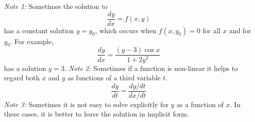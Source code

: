     \indent
    \textit{Note 1:} Sometimes the solution to $$\frac{dy}{dx} = f(x, y)$$ has a constant solution $y = y_0$, which occurs when $f(x, y_0) = 0$ for all $x$ and for $y_0$. For example,
    \begin{equation*}
        \frac{dy}{dx} = \frac{(y - 3)\cos x}{1 + 2y^2}
    \end{equation*}
    has a solution $y = 3$.
    \newline \indent
    \textit{Note 2:} Sometimes if a function is non-linear it helps to regard both $x$ and $y$ as functions of a third variable $t$.
    \begin{equation*}
        \frac{dy}{dt} = \frac{dy/dt}{dx/dt}
    \end{equation*}
    \indent
    \textit{Note 3:} Sometimes it is not easy to solve explicitly for $y$ as a function of $x$. In these cases, it is better to leave the solution in implicit form.
    